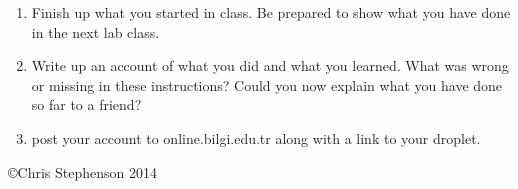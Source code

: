 \documentclass[12pt, a4paper]{article}
\begin{document}

\begin{enumerate}
\item Finish up what you started in class. Be prepared to show what you have done in the next lab class. 
\item Write up an account of what you did and what you learned. What was wrong or missing in these instructions? Could you now explain what you have done so far to a friend?
\item post your account to online.bilgi.edu.tr along with a link to your droplet.

\end{enumerate}

\copyright Chris Stephenson 2014
\end{document}
